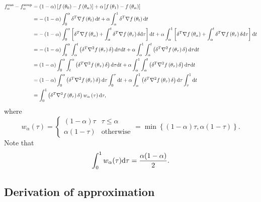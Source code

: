 \begin{align}
	f_\alpha^{\mathrm{ens}}-f_\alpha^{\mathrm{soup}} & =\left(1-\alpha\right)\left[f\left(\theta_{0}\right)-f\left(\theta_{\alpha}\right)\right]+\alpha\left[f\left(\theta_{1}\right)-f\left(\theta_{\alpha}\right)\right]\nonumber \\
	& =-\left(1-\alpha\right)\int_{0}^{\alpha}\delta^{T}\nabla f\left(\theta_{t}\right)\mathrm{d} t+\alpha\int_{\alpha}^{1}\delta^{T}\nabla f\left(\theta_{t}\right)\mathrm{d} t\nonumber \\
	& =-\left(1-\alpha\right)\int_{0}^{\alpha}\left[\delta^{T}\nabla f\left(\theta_{\alpha}\right)+\int_{\alpha}^{t}\delta^{T}\nabla f\left(\theta_{\tau}\right)\delta \mathrm{d}\tau\right]\mathrm{d} t+\alpha\int_{\alpha}^{1}\left[\delta^{T}\nabla f\left(\theta_{\alpha}\right)+\int_{\alpha}^{t}\delta^{T}\nabla f\left(\theta_{\tau}\right)\delta \mathrm{d}\tau\right]\mathrm{d} t\nonumber \\
	& =-\left(1-\alpha\right)\int_{0}^{\alpha}\int_{\alpha}^{t}\left(\delta^{T}\nabla^{2} f\left(\theta_{\tau}\right)\delta\right)\mathrm{d}\tau \mathrm{d} t+\alpha\int_{\alpha}^{1}\int_{\alpha}^{t}\left(\delta^{T}\nabla^{2} f\left(\theta_{\tau}\right)\delta\right)\mathrm{d}\tau \mathrm{d} t\nonumber \\
	& =\left(1-\alpha\right)\int_{0}^{\alpha}\int_{t}^{\alpha}\left(\delta^{T}\nabla^{2} f\left(\theta_{\tau}\right)\delta\right)\mathrm{d}\tau \mathrm{d} t+\alpha\int_{\alpha}^{1}\int_{\alpha}^{t}\left(\delta^{T}\nabla^{2} f\left(\theta_{\tau}\right)\delta\right)\mathrm{d}\tau \mathrm{d} t\nonumber \\
	& =\left(1-\alpha\right)\int_{0}^{\alpha}\left(\delta^{T}\nabla^{2} f\left(\theta_{\tau}\right)\delta\right)\mathrm{d}\tau\int_{0}^{\tau}\mathrm{d} t+\alpha\int_{\alpha}^{1}\left(\delta^{T}\nabla^{2} f\left(\theta_{\tau}\right)\delta\right)\mathrm{d}\tau\int_{\tau}^{1}\mathrm{d} t\nonumber \\
	& =\int_{0}^{1}\left(\delta^{T}\nabla^{2} f\left(\theta_{\tau}\right)\delta\right)w_{\alpha}\left(\tau\right)\mathrm{d}\tau,
	\label{eq:fose-fwse}
\end{align}
where
\[
w_{\alpha}\left(\tau\right)=\begin{cases}
	\left(1-\alpha\right)\tau & \tau\le\alpha\\
	\alpha\left(1-\tau\right) & \text{otherwise}
\end{cases}=\min\left\{ \left(1-\alpha\right)\tau,\alpha\left(1-\tau\right)\right\}.
\]
Note that
\begin{equation*}
	\int_0^1 w_\alpha(\tau)\mathrm{d} \tau = \frac{\alpha (1-\alpha)}{2}.
\end{equation*}

\subsection{Derivation of approximation}\label{app:theory-deriv}

